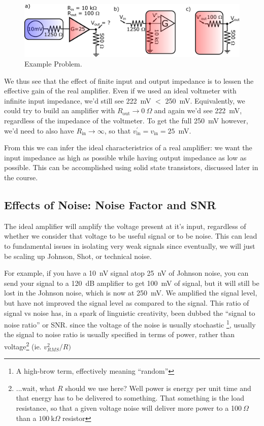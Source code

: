 \documentclass{tufte-book}
\begin{document}
\begin{figure}[ht]
\caption{Example Problem.}
\label{fig:prob_amp}
\begin{center}
\includegraphics[width=\textwidth]{Images/amp_example.pdf}
\end{center}
\end{figure}

We thus see that the effect of finite input and output impedance is to lessen the effective gain of the real amplifier. Even if we used an ideal voltmeter with infinite input impedance, we'd still see 222~mV $<$ 250~mV. Equivalently, we could try to build an amplifier with $R_\text{out} \rightarrow 0~\Omega$ and again we'd see 222~mV, regardless of the impedance of the voltmeter. To get the full 250~mV however, we'd need to also have $R_\text{in} \rightarrow \infty$, so that $v_\text{in}^\prime = v_\text{in} = 25$~mV. 

From this we can infer the ideal characteristrics of a real amplifier: we want the input impedance as high as possible while having output impedance as low as possible. This can be accomplished using solid state transistors, discussed later in the course. 

\subsection{Effects of Noise: Noise Factor and SNR}
The ideal amplifier will amplify the voltage present at it's input, regardless of whether we consider that voltage to be useful signal or to be noise. This can lead to fundamental issues in isolating very weak signals since eventually, we will just be scaling up Johnson, Shot, or technical noise. 

For example, if you have a 10~nV signal atop 25~nV of Johnson noise, you can send your signal to a 120~dB amplifier to get 100~mV of signal, but it will still be lost in the Johnson noise, which is now at 250~mV.  We amplified the signal level, but have not improved the signal level as compared to the signal. This ratio of signal vs noise has, in a spark of linguistic creativity, been dubbed the ``signal to noise ratio'' or SNR. since the voltage of the noise is usually stochastic \footnote{ A high-brow term, effectively meaning ``random''}, usually the signal to noise ratio is usually specified in terms of power, rather than voltage\footnote{ ...wait, what $R$ should we use here? Well power is energy per unit time and that energy has to be delivered to something. That something is the load resistance, so that a given voltage noise will deliver more power to a 1$00~\Omega$ than a $100~\text{k}\Omega$ resistor} (ie. $v_{RMS}^2/R)$
\end{document}
